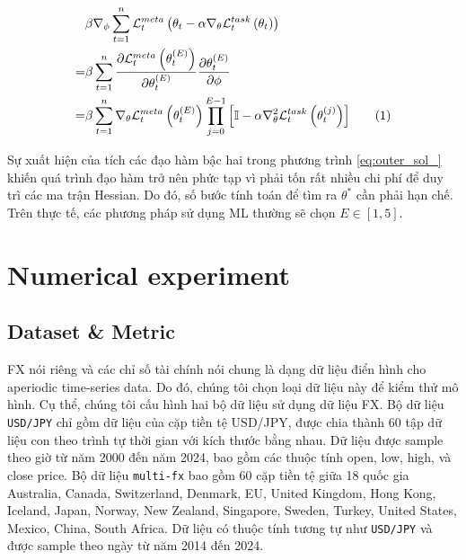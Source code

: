 \documentclass[aps,prb,groupedaddress,twocolumn,showpacs,dvipdfmx,superscriptaddress,pdftex]{revtex4-2}
\newcommand\numberthis{\addtocounter{equation}{1}\tag{\theequation}}
\begin{document}

\begin{align*}
    &\beta \nabla_{\phi} \sum_{t=1}^n{\mathcal{L}^{meta}_t \left( \theta_t - \alpha \nabla_{\theta} \mathcal{L}^{task}_t\left( \theta_t \right) \right)}\\
    = &\beta \sum_{t=1}^n{ \frac{\partial \mathcal{L}^{meta}_t\left(\theta_t^{(E)}\right)}{\partial \theta_t^{(E)}} \frac{\partial \theta_t^{(E)}}{\partial \phi}}\\
    = &\beta \sum_{t=1}^n{ \nabla_{\theta} \mathcal{L}^{meta}_t\left(\theta_t^{(E)}\right) \prod_{j=0}^{E-1} {\left[\mathbb{I} - \alpha\nabla^2_{\theta}\mathcal{L}^{task}_{t}\left(\theta_t^{(j)}\right)\right]}} \numberthis
    \label{eq:outer_sol_}
\end{align*}

Sự xuất hiện của tích các đạo hàm bậc hai trong phương trình \ref{eq:outer_sol_} khiến quá trình đạo hàm trở nên phức tạp vì phải tốn rất nhiều chi phí để duy trì các ma trận Hessian. Do đó, số bước tính toán để tìm ra $\theta^*$ cần phải hạn chế. Trên thực tế, các phương pháp sử dụng ML \citep{fallah2020personalized, chen2018federated, nguyen2022meta,finn2017model, li2017meta} thường sẽ chọn $E\in [1,5]$.


\section{Numerical experiment}
\label{sec.experiment}

\subsection{Dataset \& Metric}

FX nói riêng và các chỉ số tài chính nói chung là dạng dữ liệu điển hình cho aperiodic time-series data. Do đó, chúng tôi chọn loại dữ liệu này để kiểm thử mô hình. Cụ thể, chúng tôi cấu hình hai bộ dữ liệu sử dụng dữ liệu FX. Bộ dữ liệu \verb|USD/JPY| chỉ gồm dữ liệu của cặp tiền tệ USD/JPY, được chia thành 60 tập dữ liệu con theo trình tự thời gian với kích thước bằng nhau. Dữ liệu được sample theo giờ từ năm 2000 đến năm 2024, bao gồm các thuộc tính open, low, high, và close price. Bộ dữ liệu \verb|multi-fx| bao gồm 60 cặp tiền tệ giữa 18 quốc gia Australia, Canada, Switzerland, Denmark, EU, United Kingdom, Hong Kong, Iceland, Japan, Norway, New Zealand, Singapore, Sweden, Turkey, United States, Mexico, China, South Africa. Dữ liệu có thuộc tính tương tự như \verb|USD/JPY| và được sample theo ngày từ năm 2014 đến 2024.
\end{document}

